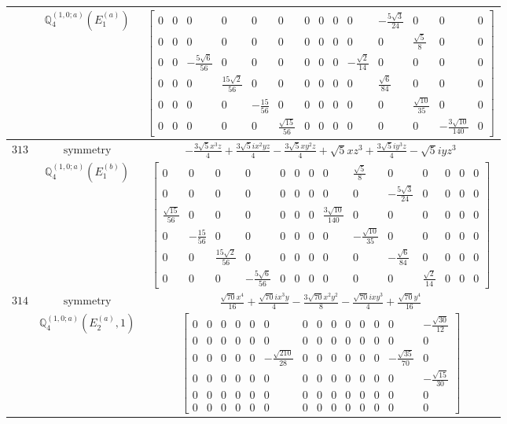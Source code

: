 \documentclass[fleqn,8pt,landscape]{jsarticle}
\begin{document}
\begin{longtable}{ccc}
$  $ & $ \mathbb{Q}_{4}^{(1,0;a)}(E_{1}^{(a)}) $ & $ \begin{bmatrix} 0 & 0 & 0 & 0 & 0 & 0 & 0 & 0 & 0 & 0 & - \frac{5 \sqrt{3}}{24} & 0 & 0 & 0 \\ 0 & 0 & 0 & 0 & 0 & 0 & 0 & 0 & 0 & 0 & 0 & \frac{\sqrt{5}}{8} & 0 & 0 \\ 0 & 0 & - \frac{5 \sqrt{6}}{56} & 0 & 0 & 0 & 0 & 0 & 0 & - \frac{\sqrt{2}}{14} & 0 & 0 & 0 & 0 \\ 0 & 0 & 0 & \frac{15 \sqrt{2}}{56} & 0 & 0 & 0 & 0 & 0 & 0 & \frac{\sqrt{6}}{84} & 0 & 0 & 0 \\ 0 & 0 & 0 & 0 & - \frac{15}{56} & 0 & 0 & 0 & 0 & 0 & 0 & \frac{\sqrt{10}}{35} & 0 & 0 \\ 0 & 0 & 0 & 0 & 0 & \frac{\sqrt{15}}{56} & 0 & 0 & 0 & 0 & 0 & 0 & - \frac{3 \sqrt{10}}{140} & 0 \end{bmatrix} $ \\ \hline
$ 313 $ & $ \text{symmetry} $ & $ - \frac{3 \sqrt{5} x^{3} z}{4} + \frac{3 \sqrt{5} i x^{2} y z}{4} - \frac{3 \sqrt{5} x y^{2} z}{4} + \sqrt{5} x z^{3} + \frac{3 \sqrt{5} i y^{3} z}{4} - \sqrt{5} i y z^{3} $ \\
$  $ & $ \mathbb{Q}_{4}^{(1,0;a)}(E_{1}^{(b)}) $ & $ \begin{bmatrix} 0 & 0 & 0 & 0 & 0 & 0 & 0 & 0 & \frac{\sqrt{5}}{8} & 0 & 0 & 0 & 0 & 0 \\ 0 & 0 & 0 & 0 & 0 & 0 & 0 & 0 & 0 & - \frac{5 \sqrt{3}}{24} & 0 & 0 & 0 & 0 \\ \frac{\sqrt{15}}{56} & 0 & 0 & 0 & 0 & 0 & 0 & \frac{3 \sqrt{10}}{140} & 0 & 0 & 0 & 0 & 0 & 0 \\ 0 & - \frac{15}{56} & 0 & 0 & 0 & 0 & 0 & 0 & - \frac{\sqrt{10}}{35} & 0 & 0 & 0 & 0 & 0 \\ 0 & 0 & \frac{15 \sqrt{2}}{56} & 0 & 0 & 0 & 0 & 0 & 0 & - \frac{\sqrt{6}}{84} & 0 & 0 & 0 & 0 \\ 0 & 0 & 0 & - \frac{5 \sqrt{6}}{56} & 0 & 0 & 0 & 0 & 0 & 0 & \frac{\sqrt{2}}{14} & 0 & 0 & 0 \end{bmatrix} $ \\ \hline
$ 314 $ & $ \text{symmetry} $ & $ \frac{\sqrt{70} x^{4}}{16} + \frac{\sqrt{70} i x^{3} y}{4} - \frac{3 \sqrt{70} x^{2} y^{2}}{8} - \frac{\sqrt{70} i x y^{3}}{4} + \frac{\sqrt{70} y^{4}}{16} $ \\
$  $ & $ \mathbb{Q}_{4}^{(1,0;a)}(E_{2}^{(a)},1) $ & $ \begin{bmatrix} 0 & 0 & 0 & 0 & 0 & 0 & 0 & 0 & 0 & 0 & 0 & 0 & 0 & - \frac{\sqrt{30}}{12} \\ 0 & 0 & 0 & 0 & 0 & 0 & 0 & 0 & 0 & 0 & 0 & 0 & 0 & 0 \\ 0 & 0 & 0 & 0 & 0 & - \frac{\sqrt{210}}{28} & 0 & 0 & 0 & 0 & 0 & 0 & - \frac{\sqrt{35}}{70} & 0 \\ 0 & 0 & 0 & 0 & 0 & 0 & 0 & 0 & 0 & 0 & 0 & 0 & 0 & - \frac{\sqrt{15}}{30} \\ 0 & 0 & 0 & 0 & 0 & 0 & 0 & 0 & 0 & 0 & 0 & 0 & 0 & 0 \\ 0 & 0 & 0 & 0 & 0 & 0 & 0 & 0 & 0 & 0 & 0 & 0 & 0 & 0 \end{bmatrix} $ \\ \hline

\end{longtable}
\end{document}
